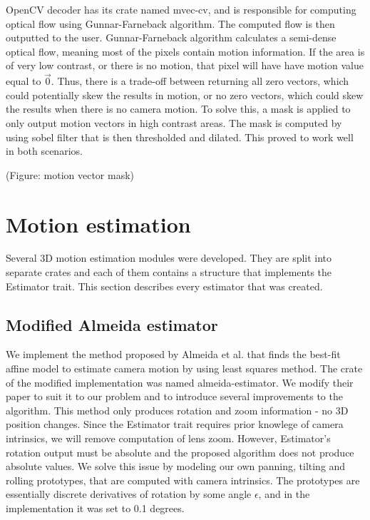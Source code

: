 \documentclass[11pt,english]{report}
\begin{document}
OpenCV decoder has its crate named mvec-cv, and is responsible for computing optical flow using Gunnar-Farneback algorithm\cite{Farnebck2003TwoFrameME}. The computed flow is then outputted to the user. Gunnar-Farneback algorithm calculates a semi-dense optical flow, meaning most of the pixels contain motion information. If the area is of very low contrast, or there is no motion, that pixel will have have motion value equal to $\overrightarrow{0}$. Thus, there is a trade-off between returning all zero vectors, which could potentially skew the results in motion, or no zero vectors, which could skew the results when there is no camera motion. To solve this, a mask is applied to only output motion vectors in high contrast areas. The mask is computed by using sobel filter that is then thresholded and dilated. This proved to work well in both scenarios.

(Figure: motion vector mask)

\section{Motion estimation}

Several 3D motion estimation modules were developed. They are split into separate crates and each of them contains a structure that implements the Estimator trait. This section describes every estimator that was created.

\subsection{Modified Almeida estimator}

We implement the method proposed by Almeida et al. that finds the best-fit affine model to estimate camera motion by using least squares method\cite{almeida}. The crate of the modified implementation was named almeida-estimator. We modify their paper to suit it to our problem and to introduce several improvements to the algorithm. This method only produces rotation and zoom information - no 3D position changes. Since the Estimator trait requires prior knowlege of camera intrinsics, we will remove computation of lens zoom. However, Estimator's rotation output must be absolute and the proposed algorithm does not produce absolute values. We solve this issue by modeling our own panning, tilting and rolling prototypes, that are computed with camera intrinsics. The prototypes are essentially discrete derivatives of rotation by some angle $\epsilon$, and in the implementation it was set to 0.1 degrees.
\end{document}
